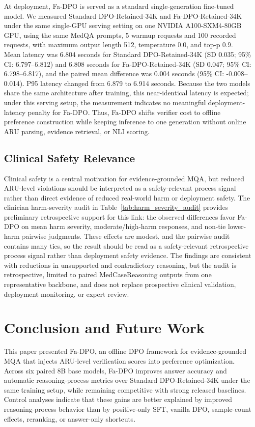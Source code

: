 \documentclass[a4paper,fleqn,doubleblind]{cas-sc}
\begin{document}
At deployment, Fa-DPO is served as a standard single-generation fine-tuned model. We measured Standard DPO-Retained-34K and Fa-DPO-Retained-34K under the same single-GPU serving setting on one NVIDIA A100-SXM4-80GB GPU, using the same MedQA prompts, 5 warmup requests and 100 recorded requests, with maximum output length 512, temperature 0.0, and top-p 0.9. Mean latency was 6.804 seconds for Standard DPO-Retained-34K (SD 0.035; 95\% CI: 6.797--6.812) and 6.808 seconds for Fa-DPO-Retained-34K (SD 0.047; 95\% CI: 6.798--6.817), and the paired mean difference was 0.004 seconds (95\% CI: -0.008--0.014). P95 latency changed from 6.879 to 6.914 seconds. Because the two models share the same architecture after training, this near-identical latency is expected; under this serving setup, the measurement indicates no meaningful deployment-latency penalty for Fa-DPO. Thus, Fa-DPO shifts verifier cost to offline preference construction while keeping inference to one generation without online ARU parsing, evidence retrieval, or NLI scoring.

\subsection{Clinical Safety Relevance}
Clinical safety is a central motivation for evidence-grounded MQA, but reduced ARU-level violations should be interpreted as a safety-relevant process signal rather than direct evidence of reduced real-world harm or deployment safety. The clinician harm-severity audit in Table~\ref{tab:harm_severity_audit} provides preliminary retrospective support for this link: the observed differences favor Fa-DPO on mean harm severity, moderate/high-harm responses, and non-tie lower-harm pairwise judgments. These effects are modest, and the pairwise audit contains many ties, so the result should be read as a safety-relevant retrospective process signal rather than deployment safety evidence. The findings are consistent with reductions in unsupported and contradictory reasoning, but the audit is retrospective, limited to paired MedCaseReasoning outputs from one representative backbone, and does not replace prospective clinical validation, deployment monitoring, or expert review.


\section{Conclusion and Future Work}
This paper presented Fa-DPO, an offline DPO framework for evidence-grounded MQA that injects ARU-level verification scores into preference optimization. Across six paired 8B base models, Fa-DPO improves answer accuracy and automatic reasoning-process metrics over Standard DPO-Retained-34K under the same training setup, while remaining competitive with strong released baselines. Control analyses indicate that these gains are better explained by improved reasoning-process behavior than by positive-only SFT, vanilla DPO, sample-count effects, reranking, or answer-only shortcuts.
\end{document}
